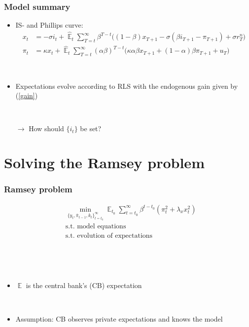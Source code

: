 \documentclass[11pt]{beamer}
\DeclareMathOperator{\E}{\mathbb{E}}
\begin{document}
\begin{frame}
	\frametitle{Model summary}
	\label{aggregate_LOMS}
\begin{itemize}
\item IS- and Phillips curve:	
 \begin{align}
x_t &=  -\sigma i_t +\hat{\E}_t \sum_{T=t}^{\infty} \beta^{T-t }\big( (1-\beta)x_{T+1} - \sigma(\beta i_{T+1} - \pi_{T+1}) +\sigma r_T^n \big)  \label{NKIS}  \\
\pi_t &= \kappa x_t +\hat{\E}_t \sum_{T=t}^{\infty} (\alpha\beta)^{T-t }\big( \kappa \alpha \beta x_{T+1} + (1-\alpha)\beta \pi_{T+1} + u_T\big) \label{NKPC} 
\end{align}
\hfill \hyperlink{derivations}{} \hyperlink{ALMs}{}

\

\item  Expectations evolve according to RLS with the endogenous gain given by (\ref{gain})

\

\item[$\rightarrow$] How should $\{ i_t \}$ be set?
\end{itemize}



\end{frame}


\section{Solving the Ramsey problem}

\begin{frame}
	\frametitle{Ramsey problem}
	 \begin{align*}
& \min_{ \{y_t, \bar{\pi}_{t-1}, k_t \}_{t=t_0}^{\infty}} \E_{t_0}\sum_{t=t_0}^{\infty} \beta^{t-t_0} (\pi_t^2  + \lambda_x x_t^2 )  \\
& \text{s.t. model equations} \\
& \text{s.t. evolution of expectations} 
\end{align*}

\

\

\begin{itemize}
\item $\E$ is the central bank's (CB) expectation

\

\item Assumption: CB observes private expectations and knows the model
\end{itemize}

 

\end{frame}
\end{document}
